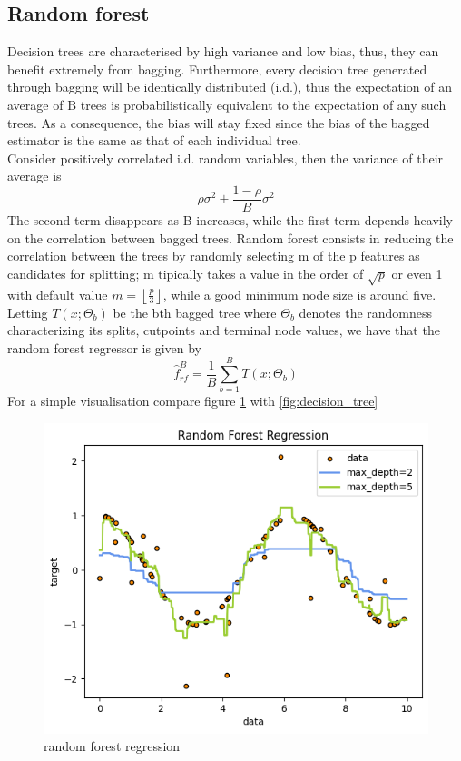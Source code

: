 \subsection{Random forest}
Decision trees are characterised by high variance and low bias, thus, they can benefit extremely from bagging. Furthermore, every decision tree generated through bagging will be identically distributed (i.d.), thus the expectation of an average of B trees is probabilistically equivalent to the expectation of any such trees. As a consequence, the bias will stay fixed since the bias of the bagged estimator is the same as that of each individual tree. 
\\
Consider positively correlated i.d. random variables, then the variance of their average is 
\begin{equation}
    \rho \sigma^2+\frac{1-\rho}{B}\sigma^2
\end{equation}
The second term disappears as B increases, while the first term depends heavily on the correlation between bagged trees. Random forest consists in reducing the correlation between the trees by randomly selecting m of the p features as candidates for splitting; m tipically takes a value in the order of $\sqrt{p}$ or even 1 with default value $m=\left\lfloor \frac{p}{3} \right\rfloor$, while a good minimum node size is around five. 
\\
Letting $T(x;\Theta_b)$ be the bth bagged tree where $\Theta_b$ denotes the randomness characterizing its splits, cutpoints and terminal node values, we have that the random forest regressor is given by
\begin{equation}
    \hat{f}_{rf}^{B}=\frac{1}{B}\sum\limits_{b=1}^{B}T(x;\Theta_b)
\end{equation}
For a simple visualisation compare figure \ref{fig:random_forest} with \ref{fig:decision_tree}
\begin{figure}
    \includegraphics[width=\textwidth]{images/random_forest.png}
    \caption{random forest regression}
    \label{fig:random_forest}
\end{figure}


